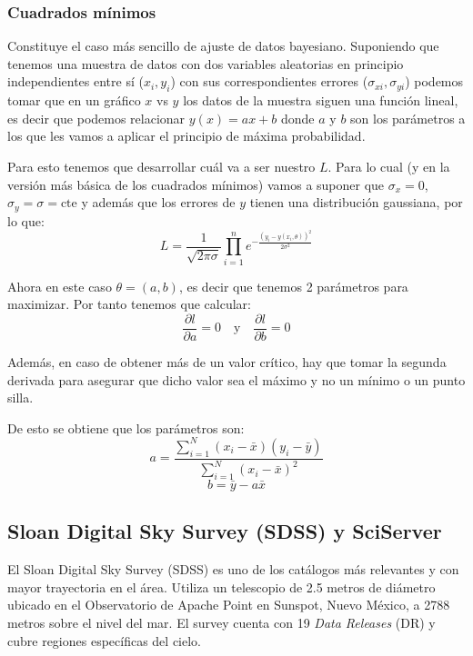 \documentclass[twocolumn]{article}
\begin{document}
\subsubsection{Cuadrados mínimos}

Constituye el caso más sencillo de ajuste de datos bayesiano. Suponiendo que tenemos una muestra de datos con dos variables aleatorias en principio independientes entre sí ($x_i,y_i$) con sus correspondientes errores ($\sigma_{xi},\sigma_{yi}$) podemos tomar que en un gráfico $x$ vs $y$ los datos de la muestra siguen una función lineal, es decir que podemos relacionar $y(x) = ax + b$ donde $a$ y $b$ son los parámetros a los que les vamos a aplicar el principio de máxima probabilidad.

Para esto tenemos que desarrollar cuál va a ser nuestro $L$. Para lo cual (y en la versión más básica de los cuadrados mínimos) vamos a suponer que $\sigma_x = 0$, $\sigma_y = \sigma = \text{cte}$ y además que los errores de $y$ tienen una distribución gaussiana, por lo que:
\begin{equation}
L = \frac{1}{\sqrt{2\pi\sigma}}\prod_{i=1}^n e^{-\frac{(y_i - y(x_i,\theta))^2}{2\sigma^2}}
\end{equation}

Ahora en este caso $\theta = (a,b)$, es decir que tenemos 2 parámetros para maximizar. Por tanto tenemos que calcular:
\[
\frac{\partial l}{\partial a} = 0 \quad \text{y} \quad \frac{\partial l}{\partial b} = 0 
\]

Además, en caso de obtener más de un valor crítico, hay que tomar la segunda derivada para asegurar que dicho valor sea el máximo y no un mínimo o un punto silla.

\medskip

De esto se obtiene que los parámetros son: 
\[
a = \frac{\sum_{i=1}^{N}(x_i - \bar{x})(y_i - \bar{y})}{\sum_{i=1}^{N}(x_i - \bar{x})^2}
\]
\[
b = \bar{y} - a\bar{x}
\]

\subsection{Sloan Digital Sky Survey (SDSS) y SciServer}

El Sloan Digital Sky Survey (SDSS) es uno de los catálogos más relevantes y con mayor trayectoria en el área. Utiliza un telescopio de 2.5 metros de diámetro ubicado en el Observatorio de Apache Point en Sunspot, Nuevo México, a 2788 metros sobre el nivel del mar. El survey cuenta con 19 \textit{Data Releases} (DR) y cubre regiones específicas del cielo.
\end{document}
